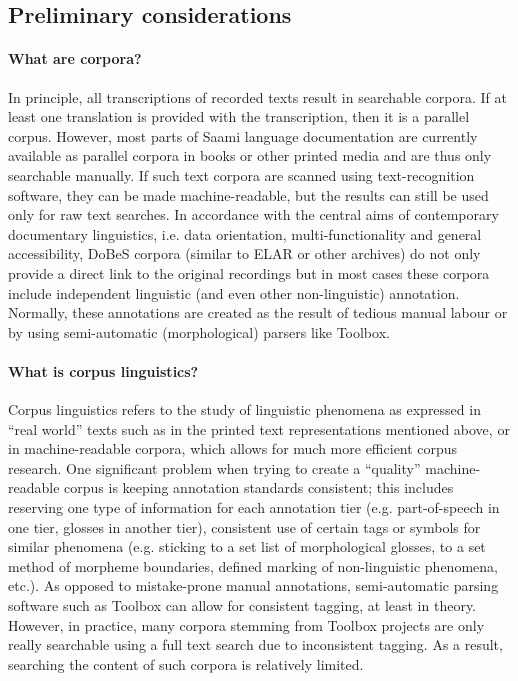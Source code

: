 \documentclass[a4paper,12pt]{article}
\begin{document}
\subsection{Preliminary considerations}%
\paragraph{What are corpora?} In principle, all transcriptions of recorded texts result in searchable corpora. If at least one translation is provided with the transcription, then it is a parallel corpus. However, most parts of Saami language documentation are currently available as parallel corpora in books or other printed media and are thus only searchable manually. If such text corpora are scanned using text-recognition software, they can be made machine-readable, but the results can still be used only for raw text searches. In accordance with the central aims of contemporary documentary linguistics, i.e. data orientation, multi-functionality and general accessibility, DoBeS corpora (similar to ELAR or other archives) do not only provide a direct link to the original recordings but in most cases these corpora include independent linguistic (and even other non-linguistic) annotation. Normally, these annotations are created as the result of tedious manual labour or by using semi-automatic (morphological) parsers like Toolbox.

\paragraph{What is corpus linguistics?} Corpus linguistics refers to the study of linguistic phenomena as expressed in “real world” texts such as in the printed text representations mentioned above, or in machine-readable corpora, which allows for much more efficient corpus research. One significant problem when trying to create a “quality” machine-readable corpus is keeping annotation standards consistent; this includes reserving one type of information for each annotation tier (e.g. part-of-speech in one tier, glosses in another tier), consistent use of certain tags or symbols for similar phenomena (e.g. sticking to a set list of morphological glosses, to a set method of morpheme boundaries, defined marking of non-linguistic phenomena, etc.). As opposed to mistake-prone manual annotations, semi-automatic parsing software such as Toolbox can allow for consistent tagging, at least in theory. However, in practice, many corpora stemming from Toolbox projects are only really searchable using a full text search due to inconsistent tagging. %
As a result, searching the content of such corpora is relatively limited.
\end{document}
